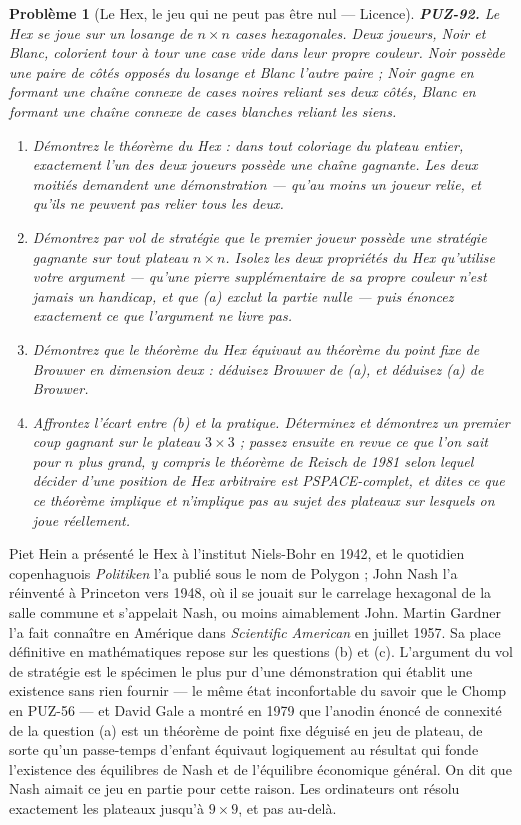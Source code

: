\documentclass[11pt]{article}
\newtheorem{problem}{Problème}
\begin{document}
\begin{problem}[{Le Hex, le jeu qui ne peut pas être nul --- Licence}]
\textbf{PUZ-92.} Le Hex se joue sur un losange de $ n \times n $ cases hexagonales. Deux
joueurs, Noir et Blanc, colorient tour à tour une case vide dans leur propre couleur. Noir
possède une paire de côtés opposés du losange et Blanc l'autre paire ; Noir gagne en formant
une chaîne connexe de cases noires reliant ses deux côtés, Blanc en formant une chaîne
connexe de cases blanches reliant les siens.
\begin{enumerate}
\item[(a)] Démontrez le théorème du Hex : dans tout coloriage du plateau entier, exactement l'un des
deux joueurs possède une chaîne gagnante. Les deux moitiés demandent une démonstration ---
qu'au moins un joueur relie, et qu'ils ne peuvent pas relier tous les deux.
\item[(b)] Démontrez par vol de stratégie que le premier joueur possède une stratégie gagnante sur
tout plateau $ n \times n $. Isolez les deux propriétés du Hex qu'utilise votre argument ---
qu'une pierre supplémentaire de sa propre couleur n'est jamais un handicap, et que (a) exclut
la partie nulle --- puis énoncez exactement ce que l'argument ne livre pas.
\item[(c)] Démontrez que le théorème du Hex équivaut au théorème du point fixe de Brouwer en
dimension deux : déduisez Brouwer de (a), et déduisez (a) de Brouwer.
\item[(d)] Affrontez l'écart entre (b) et la pratique. Déterminez et démontrez un premier coup
gagnant sur le plateau $ 3 \times 3 $ ; passez ensuite en revue ce que l'on sait pour
$ n $ plus grand, y compris le théorème de Reisch de 1981 selon lequel décider d'une
position de Hex arbitraire est PSPACE-complet, et dites ce que ce théorème implique et
n'implique pas au sujet des plateaux sur lesquels on joue réellement.
\end{enumerate}

\end{problem}

\noindent Piet Hein a présenté le Hex à l'institut Niels-Bohr en 1942, et le
quotidien copenhaguois \textit{Politiken} l'a publié sous le nom de Polygon ; John Nash l'a
réinventé à Princeton vers 1948, où il se jouait sur le carrelage hexagonal de la salle
commune et s'appelait Nash, ou moins aimablement John. Martin Gardner l'a fait connaître en
Amérique dans \textit{Scientific American} en juillet 1957. Sa place définitive en
mathématiques repose sur les questions (b) et (c). L'argument du vol de stratégie est le
spécimen le plus pur d'une démonstration qui établit une existence sans rien fournir --- le
même état inconfortable du savoir que le Chomp en PUZ-56 --- et David Gale a montré en 1979 que
l'anodin énoncé de connexité de la question (a) est un théorème de point fixe déguisé en jeu
de plateau, de sorte qu'un passe-temps d'enfant équivaut logiquement au résultat qui fonde
l'existence des équilibres de Nash et de l'équilibre économique général. On dit que Nash
aimait ce jeu en partie pour cette raison. Les ordinateurs ont résolu exactement les plateaux
jusqu'à $ 9 \times 9 $, et pas au-delà.
\end{document}
